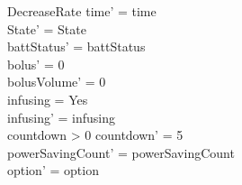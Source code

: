 \begin{schema}{DecreaseRate}
	time' = time\\ 
	State' = State\\
	battStatus' = battStatus\\
	bolus' = 0\\
	bolusVolume' = 0\\
	infusing = Yes\\
	infusing' = infusing\\
	countdown > 0 \land countdown' = 5\\
	powerSavingCount' = powerSavingCount\\ option' = option\\
\end{schema}

